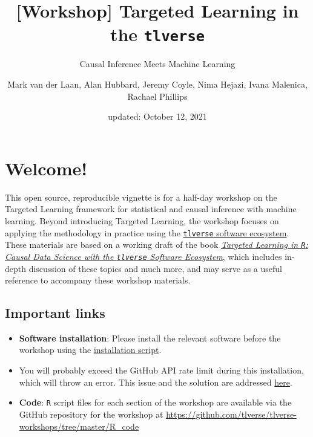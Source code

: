 \documentclass[
  12pt, krantz2,
]{book}
\title{{[}Workshop{]} Targeted Learning in the \passthrough{\lstinline!tlverse!}}
\subtitle{Causal Inference Meets Machine Learning}
\author{Mark van der Laan, Alan Hubbard, Jeremy Coyle, Nima Hejazi, Ivana Malenica, Rachael Phillips}
\date{updated: October 12, 2021}
\newcommand{\passthrough}[1]{#1}
\theoremstyle{definition}
\theoremstyle{definition}
\theoremstyle{definition}
\newcommand{\1}{\mathbbm{1}}
\begin{document}
\maketitle


\thispagestyle{empty}

\begin{center}
\end{center}

\setlength{\abovedisplayskip}{-5pt}
\setlength{\abovedisplayshortskip}{-5pt}

\mainmatter

{
\hypersetup{linkcolor=}
\setcounter{tocdepth}{2}
\tableofcontents
}
\listoftables
\listoffigures
\hypertarget{welcome}{%
\chapter*{Welcome!}\label{welcome}}


This open source, reproducible vignette is for a half-day workshop on the
Targeted Learning framework for statistical and causal inference with machine
learning. Beyond introducing Targeted Learning, the workshop focuses on
applying the methodology in practice using the \href{https://github.com/tlverse}{\passthrough{\lstinline!tlverse!} software
ecosystem}. These materials are based on a working
draft of the book \href{https://tlverse.org/tlverse-handbook/}{\emph{Targeted Learning in \passthrough{\lstinline!R!}: Causal Data Science with the
\passthrough{\lstinline!tlverse!} Software Ecosystem}}, which
includes in-depth discussion of these topics and much more, and may serve as a
useful reference to accompany these workshop materials.

\hypertarget{important-links}{%
\section*{Important links}\label{important-links}}


\begin{itemize}
\item
  \textbf{Software installation}: Please install the relevant software before the
  workshop using the \href{https://github.com/tlverse/tlverse-workshops/blob/master/install.R}{installation
  script}.
\item
  You will probably exceed the GitHub API rate limit during this installation,
  which will throw an error. This issue and the solution are addressed
  \protect\hyperlink{installtlverse}{here}.
\item
  \textbf{Code}: \passthrough{\lstinline!R!} script files for each section of the workshop are available via
  the GitHub repository for the workshop at
  \url{https://github.com/tlverse/tlverse-workshops/tree/master/R_code}
\end{itemize}
\end{document}

